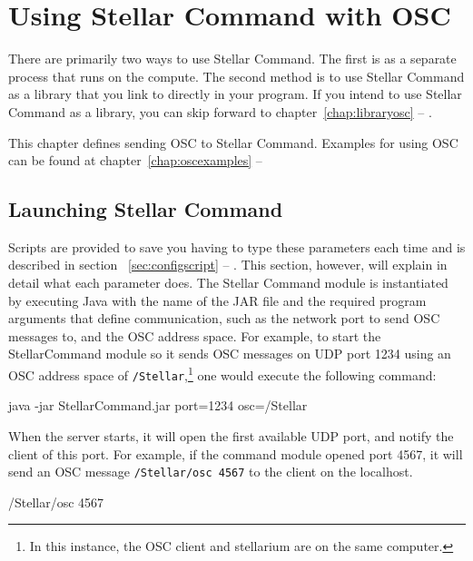 \chapter{Using Stellar Command with OSC} \label{chap:launchosc}
There are primarily two ways to use Stellar Command. The first is as a separate process that runs on the compute. The second method is to use Stellar Command as a library that you link to directly in your program. If you intend to use Stellar Command as a library, you can skip forward to chapter~\ref{chap:libraryosc} --
\emph{}. 

This chapter defines sending OSC to Stellar Command.  Examples for using OSC can be found at 
chapter~\ref{chap:oscexamples} --
\emph{}


\section{Launching Stellar Command} \label{sec:launchcommand}
Scripts are provided to save you having to type these parameters each time and is described in section ~\ref{sec:configscript} --
\emph{}. This section, however, will explain in detail what each parameter does.
The Stellar Command module is instantiated by executing Java  with the name of the JAR file and the required program arguments that define communication, such as the network port to send OSC messages to, and the OSC address space.  
For example, to start the StellarCommand module so it sends OSC messages on UDP port 1234  using an OSC address space of \texttt{/Stellar},\footnote{In this instance, the OSC client and stellarium are on the same computer.} one would execute the following command:\\

\begin{syntax}  
\medskip
	java -jar StellarCommand.jar port=1234 osc=/Stellar  \\
\medskip
\end{syntax}
\bigskip
   When the server starts, it will open the first available UDP port, and notify the client of this port. For example, if the command module opened port 4567, it will send an OSC message \texttt{/Stellar/osc 4567} to the client on the localhost. 
   
\begin{syntax}
\medskip
	/Stellar/osc 4567  \\
\medskip
\end{syntax}
\bigskip

